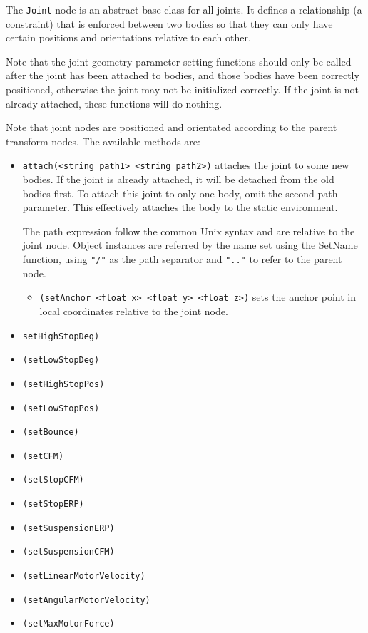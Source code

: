 The \texttt{Joint} node is an abstract base class for all joints.  It
defines a relationship (a constraint) that is enforced between two
bodies so that they can only have certain positions and orientations
relative to each other.

Note that the joint geometry parameter setting functions should only
be called after the joint has been attached to bodies, and those
bodies have been correctly positioned, otherwise the joint may not be
initialized correctly. If the joint is not already attached, these
functions will do nothing. 

Note that joint nodes are positioned and orientated according to the
parent transform nodes. The available methods are:

\begin{itemize}
\item \texttt{attach(<string path1> <string path2>)} attaches the
  joint to some new bodies. If the joint is already attached, it will
  be detached from the old bodies first. To attach this joint to only
  one body, omit the second path parameter.  This effectively attaches
  the body to the static environment.  
  
  The path expression follow the common Unix syntax and are relative
  to the joint node. Object instances are referred by the name set
  using the SetName function, using \texttt{"/"} as the path separator
  and \texttt{".."} to refer to the parent node.

\begin{itemize}
  \item \texttt{(setAnchor <float x> <float y> <float z>)} sets the
    anchor point in local coordinates relative to the joint node.
\end{itemize}

\item \texttt{setHighStopDeg)}
\item \texttt{(setLowStopDeg)}
\item \texttt{(setHighStopPos)}
\item \texttt{(setLowStopPos)}
\item \texttt{(setBounce)}
\item \texttt{(setCFM)}
\item \texttt{(setStopCFM)}
\item \texttt{(setStopERP)}
\item \texttt{(setSuspensionERP)}
\item \texttt{(setSuspensionCFM)}
\item \texttt{(setLinearMotorVelocity)}
\item \texttt{(setAngularMotorVelocity)}
\item \texttt{(setMaxMotorForce)}

\end{itemize}

